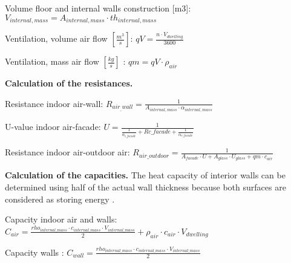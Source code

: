 \newpage
Volume floor and internal walls construction [m3]: $V_{internal,mass} = A_{internal,mass} \cdot th_{internal,mass}$

Ventilation, volume air flow $[\frac{m^3}{s}]$: $qV = \frac{n \cdot V_{dwelling}}{3600} $  

Ventilation, mass air flow $[\frac{kg}{s}]$ : $qm = qV \cdot \rho_{air} $  
\newline

\textbf{Calculation of the resistances.}
\newline

Resistance indoor air-wall: $R_{air_{\_}wall} = \frac{1}{A_{internal,mass} \cdot \alpha_{internal,mass}} $ 

U-value indoor air-facade: $U =\frac{1}{\frac{1}{\alpha_{i{\_}facade}}   + R{c{\_}facade} + \frac{1}{\alpha_{e{\_}facade}}}$ 

Resistance indoor air-outdoor air: $R_{air{\_}outdoor} = \frac{1}{A_{facade} \cdot U + A_{glass} \cdot U_{glass} + qm \cdot c_{air}}$ 
\newline

\textbf{Calculation of the capacities.}
\newline
The heat capacity of interior walls can be determined using half of the actual wall thickness because both surfaces are considered as storing energy \cite{Architecture}.

Capacity indoor air and walls: $C_{air} =\frac{rho_{internal{\_}mass} \cdot c_{internal{\_}mass} \cdot V_{internal{\_}mass}}{2} + \rho_{air} \cdot c_{air} \cdot V_{dwelling}  $ 

Capacity walls : $C_{wall} =\frac{rho_{internal{\_}mass} \cdot c_{internal{\_}mass} \cdot V_{internal{\_}mass}}{2}$   

\newpage
  